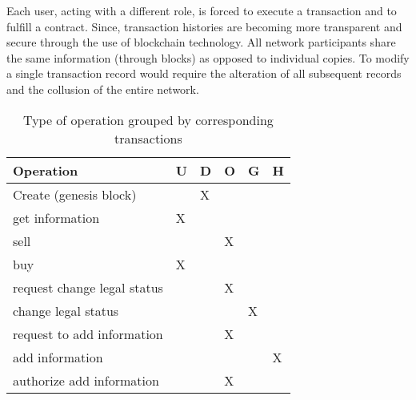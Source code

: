 Each user, acting with a different role, is forced to execute a transaction and to fulfill a contract.
Since, transaction histories are becoming more transparent and secure through the use of blockchain 
technology. All network participants share the same information (through blocks) as opposed to 
individual copies. To modify a single transaction record would require the alteration of all subsequent 
records and the collusion of the entire network.




\begin{table}[htb]
\footnotesize
    \begin{center}
    \caption{Type of operation grouped by corresponding transactions}
    \label{table:operations}
        \begin{tabular}{|l|l|l|l|l|l|}
        \hline
        \textbf{Operation}          &\textbf{U}& \textbf{D}&\textbf{O}& \textbf{G}& \textbf{H}\\ \hline\hline
        Create (genesis block)      &          & X         &          &           &           \\ \hline\hline
        get information             & X        &           &          &           &           \\ \hline\hline
        sell                        &          &           & X        &           &           \\ \hline
        buy                         & X        &           &          &           &           \\ \hline\hline
        request change legal status &          &           & X        &           &           \\ \hline
        change legal status         &          &           &          & X         &           \\ \hline\hline
        request to add information  &          &           & X        &           &           \\ \hline
        add information             &          &           &          &           & X         \\ \hline
        authorize add information   &          &           & X        &           &           \\ \hline
        \end{tabular}
    \end{center}
\end{table}